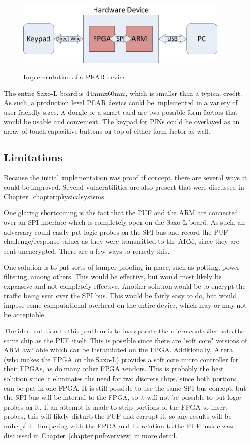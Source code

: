 \begin{figure}[!ht]
\includegraphics[width=400px]{images/pearimpl.jpg}
\label{fig:peararchitecture}
\caption{Implementation of a PEAR device}
\end{figure}
\FloatBarrier

The entire Saxo-L board is 44mmx60mm, which is smaller than a typical credit. As such, a production level PEAR
device could be implemented in a variety of user friendly sizes. A dongle or a smart card are two possible form
factors that would be usable and convenient. The keypad for PINs could be overlayed as an array of touch-capacitive 
buttons on top of either form factor as well.

\subsection{Limitations}
Because the initial implementation was proof of concept, there are several ways it could be improved. Several
vulnerabilities are also present that were discussed in Chapter~\ref{chapter:physicalsystems}.

One glaring shortcoming is the fact that the PUF and the ARM are connected over an SPI interface which is completely
open on the Saxo-L board. As such, an adversary could easily put logic probes on the SPI bus and record the PUF
challenge/response values as they were transmitted to the ARM, since they are sent unencrypted. There are a few
ways to remedy this. 

One solution is to put sorts of tamper proofing in place, such as potting, power filtering, among others. 
This would be effective, but would most likely be expensive and not completely effective. Another solution would
be to encrypt the traffic being sent over the SPI bus. This would be fairly easy to do, but would impose some
computational overhead on the entire device, which may or may not be acceptable. 

The ideal solution to this problem is to incorporate the micro controller onto the same chip as the PUF itself. This
is possible since there are "soft core" versions of ARM available which can be instantiated on the FPGA. Additionally,
Altera (who makes the FPGA on the Saxo-L) provides a soft core micro controller for their FPGAs, as do many other
FPGA vendors. This is probably the best solution since it eliminates the need for two discrete chips, since both portions
can be put in one FPGA. It is still possible to use the same SPI bus concept, but the SPI bus will be internal to the
FPGA, so it will not be possible to put logic probes on it. If an attempt is made to strip portions of the FPGA to
insert probes, this will likely disturb the PUF and corrupt it, so any results will be unhelpful. Tampering with the FPGA
and its relation to the PUF inside was discussed in Chapter~\ref{chapter:pufoverview} in more detail.


